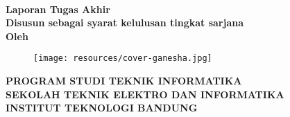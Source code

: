 \clearpage
\pagestyle{empty}


{\selectfont%
    \begin{center}

        \smallskip

        \large{\bfseries \MakeUppercase{\thetitle}}
        \\[2\baselineskip]

        \large{\bfseries Laporan Tugas Akhir}
        \\[\baselineskip]

        \normalsize{ \bfseries
            Disusun sebagai syarat kelulusan tingkat sarjana
        }
        \\[3\baselineskip]

        \normalsize{ \bfseries Oleh\\}
        \large{ \bfseries \MakeUppercase{\theauthor}}

        \vfill
        \begin{figure}[h]
            \centering
            \texttt{[image: resources/cover-ganesha.jpg]}
            \bigskip
        \end{figure}
        \vfill

        \large{ \bfseries
            \uppercase{
                Program Studi Teknik Informatika \\
                Sekolah Teknik Elektro dan Informatika \\
                Institut Teknologi Bandung\\
            }
            \thismonth
        }

    \end{center}
}%

\restoregeometry
\clearpage
